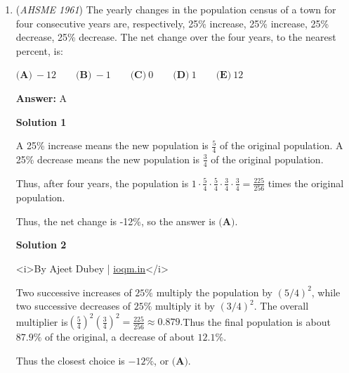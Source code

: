 \begin{enumerate}
 



\textbf{Solution 2}

<i>By Ajeet Dubey | \href{https://ioqm.in}{ioqm.in}</i>

 Let the base be $r$. Converting the two numbers to base ten gives$440_r=4r^2+4r, \qquad 340_r=3r^2+4r,$and$1000_r=r^3.$Therefore$7r^2+8r=r^3.$Since $r>0$, divide by $r$:$r^2-7r-8=0=(r-8)(r+1).$A base must be positive, so $r=8$.

 Thus the answer is $\boxed{\textbf{(D)}}$.

 


	\item (\textit{AHSME 1961}) The yearly changes in the population census of a town for four consecutive years are, 
respectively, 25\% increase, 25\% increase, 25\% decrease, 25\% decrease. 
The net change over the four years, to the nearest percent, is:


 $\textbf{(A)}\ -12 \qquad \textbf{(B)}\ -1 \qquad \textbf{(C)}\ 0 \qquad \textbf{(D)}\ 1\qquad \textbf{(E)}\ 12$

 \textbf{Answer: }A



\textbf{Solution 1}

A 25\% increase means the new population is $\frac{5}{4}$ of the original population.  A 25\% decrease means the new population is $\frac{3}{4}$ of the original population.

 Thus, after four years, the population is $1 \cdot \frac{5}{4} \cdot \frac{5}{4} \cdot \frac{3}{4} \cdot \frac{3}{4} = \frac{225}{256}$ times the original population.

 Thus, the net change is -12\%, so the answer is $\boxed{\textbf{(A)}}$.

 



\textbf{Solution 2}

<i>By Ajeet Dubey | \href{https://ioqm.in}{ioqm.in}</i>

 Two successive increases of $25\%$ multiply the population by $(5/4)^2$, while two successive decreases of $25\%$ multiply it by $(3/4)^2$. The overall multiplier is$\left(\frac54\right)^2\left(\frac34\right)^2=\frac{225}{256}\approx0.879.$Thus the final population is about $87.9\%$ of the original, a decrease of about $12.1\%$.

 Thus the closest choice is $-12\%$, or $\boxed{\textbf{(A)}}$.

 



\end{enumerate}
